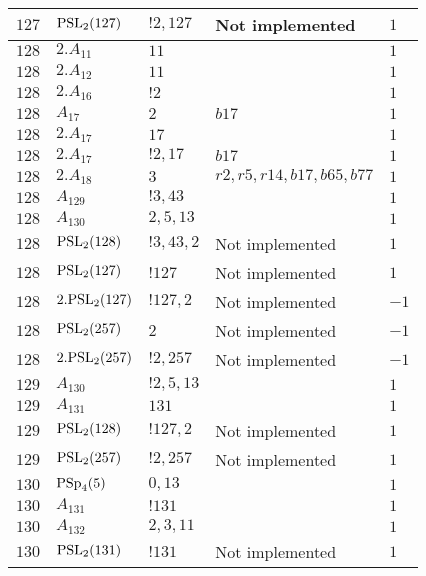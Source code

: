 \documentclass[a4paper, 11pt]{article}
\begin{document}
\begin{longtable}{lllll}
        $ 127 $ & $ {\rm PSL}_{2}(127) $ & $ !2, 127 $ &  Not implemented & $ 1$ \\ \hline
        $ 128 $ & $ 2.A_{11} $ & $ 11 $ & $ ~ $ & $ 1$ \\ \hline
        $ 128 $ & $ 2.A_{12} $ & $ 11 $ & $ ~ $ & $ 1$ \\ \hline
        $ 128 $ & $ 2.A_{16} $ & $ ! 2 $ & $ ~ $ & $ 1$ \\ \hline
        $ 128 $ & $ A_{17} $ & $ 2 $ & $ b17 $ & $ 1$ \\ \hline
        $ 128 $ & $ 2.A_{17} $ & $ 17 $ & $ ~ $ & $ 1$ \\ \hline
        $ 128 $ & $ 2.A_{17} $ & $ ! 2,17 $ & $ b17 $ & $ 1$ \\ \hline
        $ 128 $ & $ 2.A_{18} $ & $ 3 $ & $ r2, r5, r14, b17, b65, b77 $ & $ 1$ \\ \hline
        $ 128 $ & $ A_{129} $ & $ !3, 43 $ & $ ~ $ & $ 1$ \\ \hline
        $ 128 $ & $ A_{130} $ & $ 2, 5, 13 $ & $ ~ $ & $ 1$ \\ \hline
        $ 128 $ & $ {\rm PSL}_{2}(128) $ & $ !3, 43, 2 $ &  Not implemented & $ 1$ \\ \hline
        $ 128 $ & $ {\rm PSL}_{2}(127) $ & $ !127 $ &  Not implemented & $ 1$ \\ \hline
        $ 128 $ & $ 2.{\rm PSL}_{2}(127) $ & $ !127, 2 $ &  Not implemented & $ -1$ \\ \hline
        $ 128 $ & $ {\rm PSL}_{2}(257) $ & $ 2 $ &  Not implemented & $ -1$ \\ \hline
        $ 128 $ & $ 2.{\rm PSL}_{2}(257) $ & $ !2, 257 $ &  Not implemented & $ -1$ \\ \hline
        $ 129 $ & $ A_{130} $ & $ !2, 5, 13 $ & $ ~ $ & $ 1$ \\ \hline
        $ 129 $ & $ A_{131} $ & $ 131 $ & $ ~ $ & $ 1$ \\ \hline
        $ 129 $ & $ {\rm PSL}_{2}(128) $ & $ !127, 2 $ &  Not implemented & $ 1$ \\ \hline
        $ 129 $ & $ {\rm PSL}_{2}(257) $ & $ !2, 257 $ &  Not implemented & $ 1$ \\ \hline
        $ 130 $ & $ {\rm PSp}_{4}(5) $ & $ 0,13 $ & $ ~ $ & $ 1$ \\ \hline
        $ 130 $ & $ A_{131} $ & $ !131 $ & $ ~ $ & $ 1$ \\ \hline
        $ 130 $ & $ A_{132} $ & $ 2, 3, 11 $ & $ ~ $ & $ 1$ \\ \hline
        $ 130 $ & $ {\rm PSL}_{2}(131) $ & $ !131 $ &  Not implemented & $ 1$ \\ \hline

\end{longtable}
\end{document}
